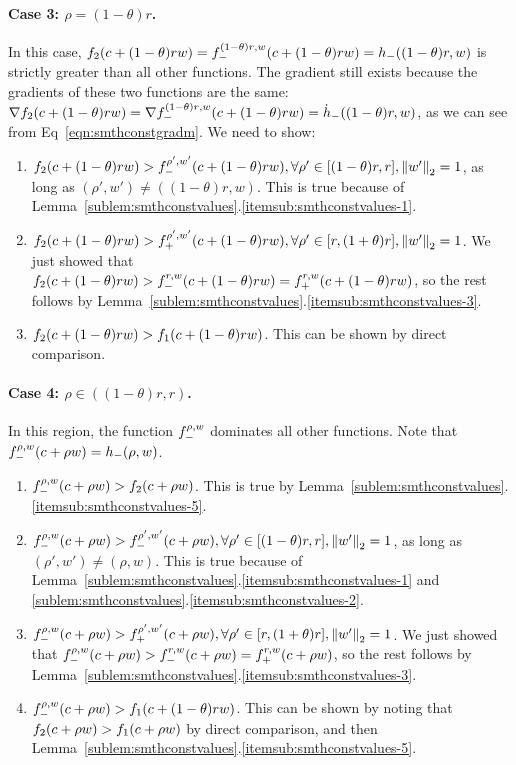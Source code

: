\paragraph{Case 3: $\rho = (1-\theta)r$.}
In this case, 
$f_{2}(c+(1-\theta)r w) = f_-^{{(1-\theta)r},{w}}(c+(1-\theta)r w) = h_-((1-\theta)r,w)$
is strictly greater than all other functions.
The gradient still exists because the gradients of these two functions are the same:
$\nabla f_{2}(c+(1-\theta)r w) = \nabla f_-^{{(1-\theta)r},{w}}(c+(1-\theta)r w) = \dot h_-((1-\theta)r, w)$,
as we can see from Eq~\eqref{eqn:smthconstgradm}. We need to show:
\begin{enumerate}
	\item $f_{2}(c+(1-\theta)r w)  > f_-^{{\rho'},{w'}}(c+(1-\theta)r w), 
	\forall \rho' \in [(1-\theta)r,r], \left\|{w'}\right\|_2 = 1$, as long as $(\rho', w') \neq ((1-\theta)r, w)$.
	This is true because of Lemma~\ref{sublem:smthconstvalues}.\ref{itemsub:smthconstvalues-1}.
	\item $f_{2}(c+(1-\theta)r w) > f_+^{{\rho'},{w'}}(c+(1-\theta)r w), 
	\forall \rho' \in [r,(1+\theta)r], \left\|{w'}\right\|_2 = 1$.
	We just showed that 
	$f_{2}(c+(1-\theta)r w) > f_-^{{r},{w}}(c+(1-\theta)r w) = f_+^{{r},{w}}(c+(1-\theta)r w)$,
	so the rest follows by Lemma~\ref{sublem:smthconstvalues}.\ref{itemsub:smthconstvalues-3}.
	\item $f_{2}(c+(1-\theta)r w) > f_{1}(c+(1-\theta)r w)$. This can be shown by direct comparison.
\end{enumerate}

\paragraph{Case 4: $\rho \in ((1-\theta)r, r)$.} 
In this region, the function $f_-^{{\rho},{w}}$ dominates all other functions.
Note that $f_-^{{\rho},{w}}(c+\rho w) = h_-(\rho, w)$.
\begin{enumerate}
	\item $f_-^{{\rho},{w}}(c+\rho w) > f_{2}(c+\rho w)$.
	This is true by Lemma~\ref{sublem:smthconstvalues}.\ref{itemsub:smthconstvalues-5}.
	\item $f_-^{{\rho},{w}}(c+\rho w) > f_-^{{\rho'},{w'}}(c+\rho w),
	\forall \rho' \in [(1-\theta)r,r], \left\|{w'}\right\|_2 = 1$, as long as $(\rho', w') \neq (\rho, w)$.
	This is true because of Lemma~\ref{sublem:smthconstvalues}.\ref{itemsub:smthconstvalues-1} and \ref{sublem:smthconstvalues}.\ref{itemsub:smthconstvalues-2}. 
	\item $f_-^{{\rho},{w}}(c+\rho w) > f_+^{{\rho'},{w'}}(c+\rho w), \forall \rho' \in [r,(1+\theta)r], \left\|{w'}\right\|_2 = 1$.
	We just showed that 
	$f_-^{{\rho},{w}}(c+\rho w) > f_-^{{r},{w}}(c+\rho w) = f_+^{{r},{w}}(c+\rho w)$,
	so the rest follows by Lemma~\ref{sublem:smthconstvalues}.\ref{itemsub:smthconstvalues-3}.
	\item $f_-^{{\rho},{w}}(c+\rho w) > f_{1}(c+(1-\theta)r w)$. This can be shown by noting that 
	$f_{2}(c+\rho w) > f_{1}(c+\rho w)$ by direct comparison, and then Lemma~\ref{sublem:smthconstvalues}.\ref{itemsub:smthconstvalues-5}.
\end{enumerate}

